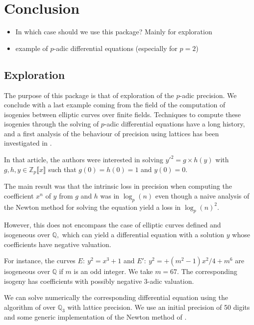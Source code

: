 \documentclass[sigconf]{acmart}
\theoremstyle{definition}
\begin{document}
\section{Conclusion}

\begin{itemize}
\item In which case should we use this package? Mainly for exploration
\item example of $p$-adic differential equations (especially for $p=2$)
\end{itemize}

\subsection{Exploration}

The purpose of this package is that of exploration
of the $p$-adic precision.
We conclude with a last example coming
from the field of the computation of
isogenies between elliptic curves over finite fields.
Techniques to compute these isogenies
through the solving of $p$-adic differential equations
have a long history, and a first
analysis of the behaviour of precision using
lattices has been investigated in \cite{LV16}.

In that article, the authors were interested in
solving $y'^2=g \times h(y)$ with
$g,h,y \in \mathbb{Z}_p \llbracket x \rrbracket$
such that $g(0)=h(0)=1$ and $y(0)=0.$

The main result was that the intrinsic loss in precision
when computing the coefficient $x^n$ of $y$
from $g$ and $h$ was in $\log_p(n)$
even though a naive analysis of
the Newton method for solving the equation
yield a loss in $\log_p(n)^2.$

However, this does not encompass the case of 
elliptic curves defined and isogeneous 
over $\mathbb{Q},$ which can yield a differential 
equation with a solution $y$ whose coefficients
have negative valuation.

For instance, the curves 
$E: \: y^2=x^3+1$
and $E': \: y^2=+ (m^2-1)x^2/4 + m^6$ are isogeneous
over $\mathbb{Q}$ if  $m$ is an odd integer.
We take $m=67.$ The corresponding isogeny has coefficients with possibly
negative $3$-adic valuation.

We can solve numerically 
the corresponding differential equation
using the algorithm of \cite{Lercier-Sirvent:08}
over $\mathbb{Q}_3$ with lattice precision.
We use an initial precision of 50 digits
and some generic implementation of the Newton
method of \cite{Lercier-Sirvent:08}.
\end{document}
